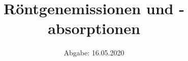 

\subject{V602}
\title{Röntgenemissionen und -absorptionen}
\date{%
  Abgabe: 16.05.2020
}



\maketitle
\thispagestyle{empty}
\tableofcontents
\newpage







\printbibliography{}




